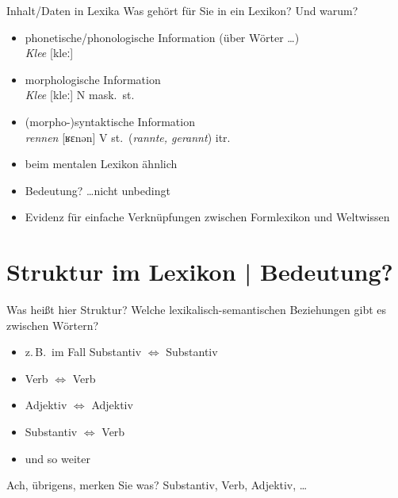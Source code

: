 \begin{frame}
  {Inhalt\slash Daten in Lexika}
  \onslide<+->
  Was gehört für Sie in ein Lexikon? Und warum?\\
  \Zeile
  \onslide<+->
  \onslide<+->
  \begin{itemize}[<+->]
    \item phonetische\slash phonologische Information (über Wörter \ldots)\\
      \Viertelzeile
      \textit{Klee} \alert{[kleː]}
    \item morphologische Information\\
      \Viertelzeile
      \textit{Klee} [kleː] \alert{N mask.\ st.}
    \item (morpho-)syntaktische Information\\
      \Viertelzeile
      \textit{rennen} [ʁɛnən] V st.\ (\textit{rannte, gerannt}) \alert{itr.}
      \Halbzeile
    \item beim mentalen Lexikon ähnlich
      \Halbzeile
    \item \alert{Bedeutung?} \ldots nicht unbedingt \citep{Elman2009}
    \item Evidenz für einfache Verknüpfungen zwischen \alert{Formlexikon} und \alert{Weltwissen}
  \end{itemize}
\end{frame}

\section{Struktur im Lexikon | Bedeutung?}

\begin{frame}
  {Was heißt hier Struktur?}
  \onslide<+->
  Welche \alert{lexikalisch-semantischen Beziehungen} gibt es zwischen Wörtern?\\
  \onslide<+->
  \onslide<+->
  \Halbzeile
  \begin{itemize}[<+->]
    \item z.\,B.\ im Fall Substantiv $\Leftrightarrow$ Substantiv
    \item Verb $\Leftrightarrow$ Verb
    \item Adjektiv $\Leftrightarrow$ Adjektiv
    \item Substantiv $\Leftrightarrow$ Verb
    \item und so weiter
  \end{itemize}
  \onslide<+->
  \Zeile
  Ach, übrigens, merken Sie was? \onslide<+-> \alert{Substantiv, Verb, Adjektiv, \ldots}
\end{frame}

